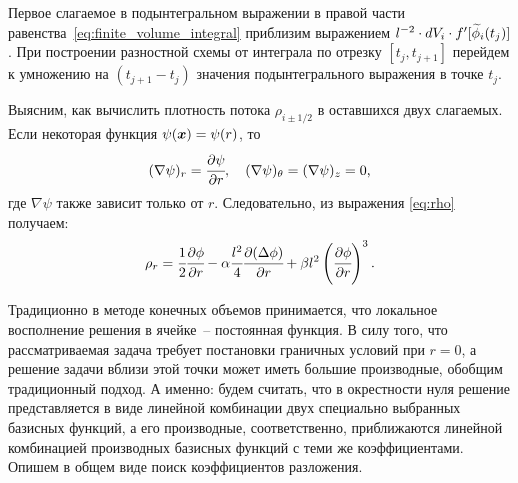 Первое слагаемое в подынтегральном выражении в правой части равенства~\eqref{eq:finite_volume_integral} приблизим выражением $l^{-2} \cdot dV_i \cdot f'[{\widetilde{\phi}}_i(t_j)]$. При построении разностной схемы от интеграла по отрезку $[t_j, t_{j + 1}]$ перейдем к умножению на $(t_{j + 1} - t_j)$ значения подынтегрального выражения в точке $t_j$.

Выясним, как вычислить плотность потока $\rho_{i \pm 1/2}$ в оставшихся двух слагаемых. Если некоторая функция $\psi({\boldsymbol{x}}) = \psi(r)$, то
$$(\nabla \psi)_r = \cfrac{\partial \psi}{\partial r}, \quad (\nabla \psi)_\theta = (\nabla \psi)_z = 0 {\text{,}}$$
где $\nabla \psi$ также зависит только от $r$. Следовательно, из выражения \eqref{eq:rho} получаем:
\begin{equation}
	\rho_r = \cfrac{1}{2} \cfrac{\partial \phi}{\partial r} - \alpha \cfrac{l^2}{4} \cfrac{\partial (\Delta \phi)}{\partial r} + \beta l^2 \left( \cfrac{\partial \phi}{\partial r} \right)^3 {\text{.}}
	\label{eq:finite_volumes_density}
\end{equation}

Традиционно в методе конечных объемов принимается, что локальное восполнение решения в ячейке~-- постоянная функция. В силу того, что рассматриваемая задача требует постановки граничных условий при $r = 0$, а решение задачи вблизи этой точки может иметь большие производные, обобщим традиционный подход. А именно: будем считать, что в окрестности нуля решение представляется в виде линейной комбинации двух специально выбранных базисных функций, а его производные, соответственно, приближаются линейной комбинацией производных базисных функций с теми же коэффициентами. Опишем в общем виде поиск коэффициентов разложения.

